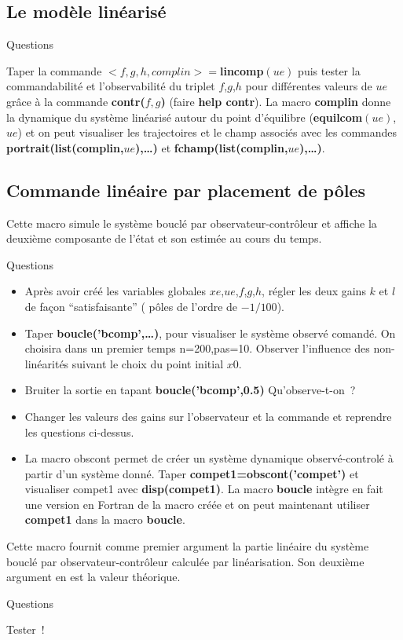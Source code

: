 \subsection{Le mod\`ele lin\'earis\'e }


\Mlincomp

\centerline{{\sc Questions}}
Taper la commande $<f,g,h,complin>=${\bf lincomp$(ue)$} puis
tester la commandabilit\'e et l'observabilit\'e du triplet
$f$,$g$,$h$ pour diff\'erentes valeurs de $ue$ gr\^ace \`a la
commande {\bf contr($f,g$)} (faire {\bf help contr}). 
La macro {\bf complin} donne la dynamique du syst\`eme 
lin\'earis\'e autour du point d'\'equilibre ({\bf equilcom}$(ue)$,$ue$) 
et on peut visualiser les trajectoires 
et le champ associ\'es avec les commandes 
{\bf portrait(list(complin,$ue$),\ldots)} et 
{\bf fchamp(list(complin,$ue$),\ldots)}.


\subsection{Commande lin\'eaire par placement de p\^oles}


\Mgaincom


\Mgainobs

Cette macro simule le syst\`eme boucl\'e par observateur-contr\^oleur
et affiche la deuxi\`eme composante de l'\'etat et son estim\'ee
au cours du temps.

\Mboucle

\centerline{{\sc Questions}}
\begin{itemize}
 \item Apr\`es avoir cr\'e\'e les variables globales $xe$,$ue$,$f$,$g$,$h$,
r\'egler les deux gains $k$ et $l$ de fa\c{c}on ``satisfaisante''
( p\^oles de l'ordre de $- 1/100$).
  \item Taper {\bf boucle('bcomp',\ldots)}, pour visualiser le syst\`eme 
  observ\'e comand\'e. On choisira dans un premier temps n=200,pas=10.
  Observer l'influence des non-lin\'earit\'es suivant le choix du point initial
$x0$.
 \item Bruiter la sortie en tapant {\bf boucle('bcomp',0.5)}
Qu'observe-t-on~?
 \item Changer les valeurs des gains sur l'observateur et la commande et 
reprendre les questions ci-dessus.
 \item La macro obscont permet de cr\'eer un syst\`eme dynamique 
  observ\'e-control\'e \`a partir d'un syst\`eme donn\'e. 
Taper {\bf compet1=obscont('compet')} et visualiser compet1 avec 
{\bf disp(compet1)}. La macro {\bf boucle}
int\`egre en fait une version en Fortran de la macro cr\'e\'ee et
on peut maintenant utiliser {\bf compet1 } dans la macro {\bf boucle}.
\end{itemize}

\Mobscont	

Cette macro fournit comme premier argument la partie lin\'eaire
du syst\`eme boucl\'e par observateur-contr\^oleur calcul\'ee
 par lin\'earisation. Son deuxi\`eme argument en est la valeur th\'eorique.
\medskip

\Mtest

\centerline{{\sc Questions}}
Tester~!




